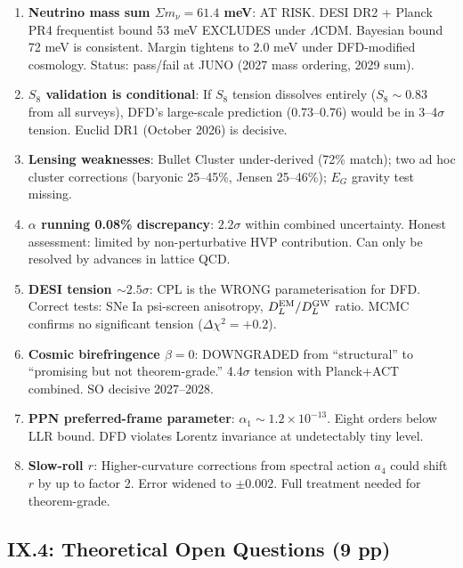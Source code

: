\documentclass[11pt,a4paper]{article}
\begin{document}
\begin{enumerate}
\item \textbf{Neutrino mass sum $\Sigma m_\nu = 61.4$ meV}: AT RISK. DESI DR2 + Planck PR4 frequentist bound 53 meV EXCLUDES under $\Lambda$CDM. Bayesian bound 72 meV is consistent. Margin tightens to 2.0 meV under DFD-modified cosmology. Status: pass/fail at JUNO (2027 mass ordering, 2029 sum).

\item \textbf{$S_8$ validation is conditional}: If $S_8$ tension dissolves entirely ($S_8 \sim 0.83$ from all surveys), DFD's large-scale prediction (0.73--0.76) would be in 3--4$\sigma$ tension. Euclid DR1 (October 2026) is decisive.

\item \textbf{Lensing weaknesses}: Bullet Cluster under-derived (72\% match); two ad hoc cluster corrections (baryonic 25--45\%, Jensen 25--46\%); $E_G$ gravity test missing.

\item \textbf{$\alpha$ running 0.08\% discrepancy}: $2.2\sigma$ within combined uncertainty. Honest assessment: limited by non-perturbative HVP contribution. Can only be resolved by advances in lattice QCD.

\item \textbf{DESI tension $\sim 2.5\sigma$}: CPL is the WRONG parameterisation for DFD. Correct tests: SNe Ia psi-screen anisotropy, $D_L^{\rm EM}/D_L^{\rm GW}$ ratio. MCMC confirms no significant tension ($\Delta\chi^2 = +0.2$).

\item \textbf{Cosmic birefringence $\beta = 0$}: DOWNGRADED from ``structural'' to ``promising but not theorem-grade.'' 4.4$\sigma$ tension with Planck+ACT combined. SO decisive 2027--2028.

\item \textbf{PPN preferred-frame parameter}: $\alpha_1 \sim 1.2 \times 10^{-13}$. Eight orders below LLR bound. DFD violates Lorentz invariance at undetectably tiny level.

\item \textbf{Slow-roll $r$}: Higher-curvature corrections from spectral action $a_4$ could shift $r$ by up to factor 2. Error widened to $\pm 0.002$. Full treatment needed for theorem-grade.
\end{enumerate}

\subsection{IX.4: Theoretical Open Questions (9 pp)}
\end{document}
